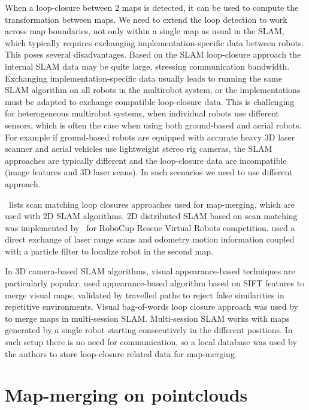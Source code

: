 When a loop-closure between 2 maps is detected, it can be used to compute the transformation between maps. We need to extend the loop detection to work across map boundaries, not only within a single map as usual in the \gls{SLAM}, which typically requires exchanging implementation-specific data between robots. This poses several disadvantages. Based on the \gls{SLAM} loop-closure approach the internal \gls{SLAM} data may be quite large, stressing communication bandwidth. Exchanging implementation-specific data usually leads to running the same \gls{SLAM} algorithm on all robots in the multirobot system, or the implementations must be adapted to exchange compatible loop-closure data. This is challenging for heterogeneous multirobot systems, when individual robots use different sensors, which is often the case when using both ground-based and aerial robots. For example if ground-based robots are equipped with accurate heavy \gls{3D} laser scanner and aerial vehicles use lightweight stereo rig cameras, the \gls{SLAM} approaches are typically different and the loop-closure data are incompatible (image features and \gls{3D} laser scans). In such scenarios we need to use different approach.

\citet{lee2012survey}~lists scan matching loop closures approaches used for map-merging, which are used with \gls{2D} \gls{SLAM} algorithms. \gls{2D} distributed \gls{SLAM} based on scan matching was implemented by~\citet{pfingsthorn2007scalable} for RoboCup Rescue Virtual Robots competition. \citet{fox2006distributed} used a direct exchange of laser range scans and odometry motion information coupled with a particle filter to localize robot in the second map.

In \gls{3D} camera-based \gls{SLAM} algorithms, visual appearance-based techniques are particularly popular. \citet{tomono2013merging} used appearance-based algorithm based on \gls{SIFT} features to merge visual maps, validated by travelled paths to reject false similarities in repetitive environments. Visual bag-of-words loop closure approach was used by~\citet{labbe2014online} to merge maps in multi-session \gls{SLAM}. Multi-session \gls{SLAM} works with maps generated by a single robot starting consecutively in the different positions. In such setup there is no need for communication, so a local database was used by the authors to store loop-closure related data for map-merging.

\section{Map-merging on pointclouds}

